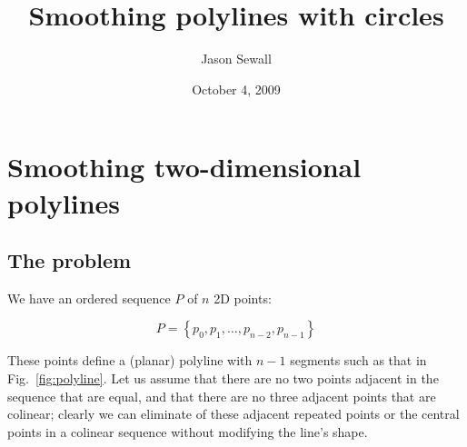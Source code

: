 \documentclass{article}
\title{Smoothing polylines with circles}
\author{Jason Sewall}
\date{October 4, 2009}
\begin{document}
\maketitle

\section{Smoothing two-dimensional polylines}

\subsection{The problem}
We have an ordered sequence $P$ of $n$ 2D points:

\begin{equation}
  \label{eq:points}
  P = \left\{p_{0}, p_{1},\ldots,p_{n-2},p_{n-1}\right\}
\end{equation}

These points define a (planar) polyline with $n-1$ segments such as that in Fig.~\ref{fig:polyline}.  Let us assume that there are no two points adjacent in the sequence that are equal, and that there are no three adjacent points that are colinear; clearly we can eliminate of these adjacent repeated points or the central points in a colinear sequence without modifying the line's shape.
\end{document}
